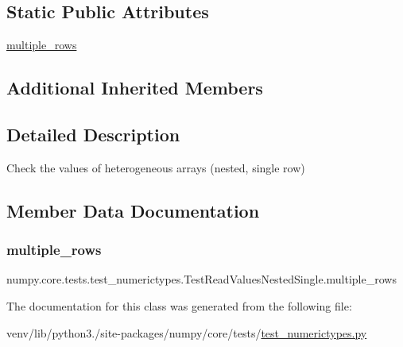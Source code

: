 \subsection*{Static Public Attributes}
\begin{DoxyCompactItemize}
\item 
\hyperlink{classnumpy_1_1core_1_1tests_1_1test__numerictypes_1_1TestReadValuesNestedSingle_a69fd00c84e2a5a1a57285a46caec2959}{multiple\+\_\+rows}
\end{DoxyCompactItemize}
\subsection*{Additional Inherited Members}


\subsection{Detailed Description}
\begin{DoxyVerb}Check the values of heterogeneous arrays (nested, single row)\end{DoxyVerb}
 

\subsection{Member Data Documentation}
\mbox{\label{classnumpy_1_1core_1_1tests_1_1test__numerictypes_1_1TestReadValuesNestedSingle_a69fd00c84e2a5a1a57285a46caec2959}} 
\subsubsection{\texorpdfstring{multiple\+\_\+rows}{multiple\_rows}}
{\footnotesize\ttfamily numpy.\+core.\+tests.\+test\+\_\+numerictypes.\+Test\+Read\+Values\+Nested\+Single.\+multiple\+\_\+rows\hspace{0.3cm}{\ttfamily [static]}}



The documentation for this class was generated from the following file\+:\begin{DoxyCompactItemize}
\item 
venv/lib/python3./site-\/packages/numpy/core/tests/\hyperlink{test__numerictypes_8py}{test\+\_\+numerictypes.\+py}\end{DoxyCompactItemize}
